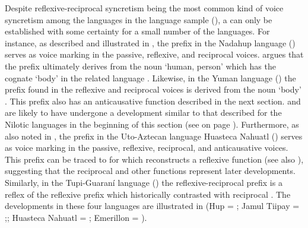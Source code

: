 Despite reflexive-reciprocal syncretism being the most common kind of voice syncretism among the languages in the language sample (), a  can only be established with some certainty for a small number of the languages. For instance, as described and illustrated in , the prefix  in the Nadahup language  () serves as voice marking in the passive, reflexive, and reciprocal voices. \citet[474, 486]{epps:2008} argues that the prefix ultimately derives from the noun  ‘human, person’ which has the cognate  ‘body’ in the related language . Likewise, in the Yuman language  () the prefix  found in the reflexive and reciprocal voices is derived from the noun  ‘body’ \citep[167]{miller:a:2001}. This prefix also has an anticausative function described in the next section.  and  are likely to have undergone a development similar to that described for the Nilotic languages in the beginning of this section (see  on page \pageref{tab:ch7:refl-recp-nilotic}). Furthermore, as also noted in , the prefix  in the Uto-Aztecan language Huasteca Nahuatl () serves as voice marking in the passive, reflexive, reciprocal, and anticausative voices. This prefix can be traced to   for which \citet{langacker:1976} reconstructs a reflexive function (see also \citealt[16]{anderson:al:1976}), suggesting that the reciprocal and other functions represent later developments. Similarly, in the Tupi-Guaraní language  () the reflexive-reciprocal prefix  \citep[348ff.]{rose:2003} is a reflex of the  reflexive prefix  which historically contrasted with reciprocal  \citep[534f.]{jensen:1998}. The developments in these four languages are illustrated in  (Hup = \citealt[479, 486]{epps:2008}; Jamul Tiipay = \citealt[166f.]{miller:a:2001};; Huasteca Nahuatl = \citealt[90]{llanes:al:2017}; Emerillon = \citealt[349f.]{rose:2003}).


